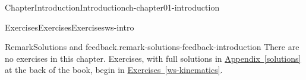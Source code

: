 \documentclass[oneside,10pt,]{book}
\newcommand{\xreffont}{\relax}
\numberwithin{equation}{section}
\begin{document}
\begin{chapterptx}{Chapter}{Introduction}{}{Introduction}{}{}{ch-chapter01-introduction}
%
%
\typeout{************************************************}
\typeout{************************************************}
%
\begin{exercises-section}{Exercises}{Exercises}{}{Exercises}{}{}{ws-intro}
\begin{introduction}{}%
\begin{remark}{Remark}{Solutions and feedback.}{remark-solutions-feedback-introduction}%
There are no exercises in this chapter. Exercises, with full solutions in \hyperref[solutions]{Appendix~{\xreffont\ref{solutions}}} at the back of the book, begin in \hyperref[ws-kinematics]{Exercises~{\xreffont\ref{ws-kinematics}}}.%
\end{remark}
\end{introduction}%
\end{exercises-section}
\end{chapterptx}
%
%
\typeout{************************************************}
\typeout{************************************************}
%
\end{document}
